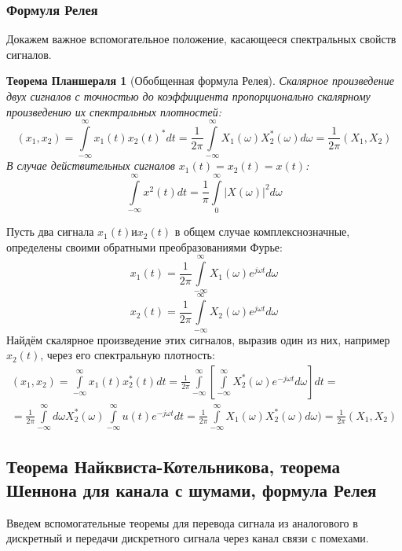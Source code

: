 \subsubsection{Формуля Релея}
Докажем важное вспомогательное положение, касающееся спектральных свойств сигналов.
	\newtheorem*{Th1*}{Теорема Планшераля}
	\begin{Th1*}[Обобщенная формула Релея]\label{thRel}
Скалярное произведение двух сигналов с точностью до коэффициента пропорционально скалярному произведению их спектральных плотностей: $$(x_1, x_2) = \int\limits_{-\infty}^{\infty}x_1(t)x_2(t)^*dt = \frac{1}{2\pi} \int\limits_{-\infty}^{\infty}X_1(\omega)X_2^*(\omega)d\omega= \frac{1}{2\pi}(X_1,X_2) $$ 
В случае действительных сигналов $x_1(t) = x_2(t) = x(t)$:
$$ \int\limits_{-\infty}^{\infty} x^2(t)dt = \frac{1}{\pi}  \int\limits_{0}^{\infty} \left|X(\omega)\right|^2d\omega$$
	\end{Th1*}
	
	
	\begin{Proof}
	Пусть два сигнала $x_1(t) и x_2(t)$ в общем случае комплекснозначные, определены своими обратными преобразованиями Фурье:
	$$	x_1(t) = \frac{1}{2\pi} \int\limits_{-\infty}^{\infty}X_1(\omega)e^{j\omega t}d\omega	$$	
	$$	x_2(t) = \frac{1}{2\pi} \int\limits_{-\infty}^{\infty}X_2(\omega)e^{j\omega t}d\omega $$
	Найдём скалярное произведение этих сигналов, выразив один из них, например $x_2(t)$, через его спектральную плотность:
	\begin{eqnarray}
		(x_1, x_2) = \int\limits_{-\infty}^{\infty}x_1(t)x_2^*(t)dt = \frac{1}{2\pi}\int\limits_{-\infty}^{\infty}\left[\int\limits_{-\infty}^{\infty} X_2^*(\omega)e^{-j\omega t}d\omega \right]dt = \\ = \frac{1}{2\pi}\int\limits_{-\infty}^{\infty}d\omega X_2^*(\omega) \int\limits_{-\infty}^{\infty} u(t)e^{-j\omega t}dt = \frac{1}{2\pi}\int\limits_{-\infty}^{\infty}X_1(\omega)X_2^*(\omega)d\omega)= \frac{1}{2\pi}(X_1,X_2)
	\end{eqnarray}
	\end{Proof}

\newpage

\subsection{Теорема Найквиста-Котельникова, теорема Шеннона для канала с шумами, формула Релея}
Введем вспомогательные теоремы для перевода сигнала из аналогового в дискретный и передачи дискретного сигнала через канал связи с помехами.
